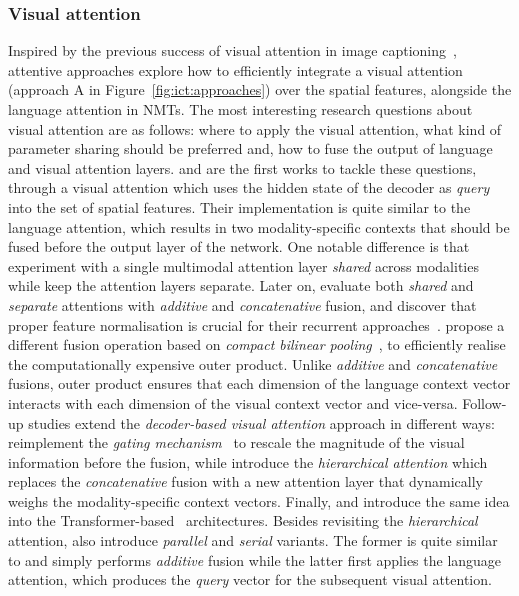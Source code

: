 \documentclass{svjour3}
\begin{document}
\subsubsection{Visual attention}
\label{sec:tasks:ict:att}
Inspired by the previous success of visual attention in image captioning~\citep{xu-show-2015}, attentive approaches explore how to efficiently integrate a visual attention (approach A in Figure~\ref{fig:ict:approaches}) over the spatial features, alongside the language attention in NMTs. The most interesting research questions about visual attention are as follows: where to apply the visual attention, what kind of parameter sharing should be preferred and, how to fuse the output of language and visual attention layers.
\cite{caglayan-does-2016} and \cite{calixto-elliott-frank:2016:WMT} are the first works to tackle these questions, through a visual attention which uses the hidden state of the decoder as \textit{query} into the set of  spatial features. Their implementation is quite similar to the language attention, which results in two modality-specific contexts that should be fused before the output layer of the network. One notable difference is that \cite{caglayan-does-2016} experiment with a single multimodal attention layer \textit{shared} across modalities while \cite{calixto-elliott-frank:2016:WMT} keep the attention layers separate. Later on, \cite{caglayan-multimodal-2016} evaluate both \textit{shared} and \textit{separate} attentions with \textit{additive} and \textit{concatenative} fusion, and discover that proper feature normalisation is crucial for their recurrent approaches~\citep{caglayan-EtAl:2018:WMT}.
\cite{delbrouck-bilinearpooling-2017} propose a different fusion operation based on \textit{compact bilinear pooling}~\citep{fukui-mcb-2016}, to efficiently realise the computationally expensive outer product. Unlike \textit{additive} and \textit{concatenative} fusions, outer product ensures that each dimension of the language context vector interacts with each dimension of the visual context vector and vice-versa.
Follow-up studies extend the \textit{decoder-based visual attention} approach in different ways: \citet{calixto-doubly-2017} reimplement the \textit{gating mechanism}~\citep{xu-show-2015} to rescale the magnitude of the visual information before the fusion,
while \citet{libovicky-att-2017} introduce the \textit{hierarchical attention} which replaces the \textit{concatenative} fusion with a new attention layer that dynamically weighs the modality-specific context vectors.
Finally, \citet{arslan-doubly-2018} and \citet{libovicky-tfatt-2018} introduce the same idea into the Transformer-based~\citep{vaswani-attention-2017} architectures. Besides revisiting the \textit{hierarchical} attention, \cite{libovicky-tfatt-2018} also introduce \textit{parallel} and \textit{serial} variants. The former is quite similar to \cite{arslan-doubly-2018} and simply performs \textit{additive} fusion while the latter first applies the language attention, which produces the \textit{query} vector for the subsequent visual attention.
\end{document}
